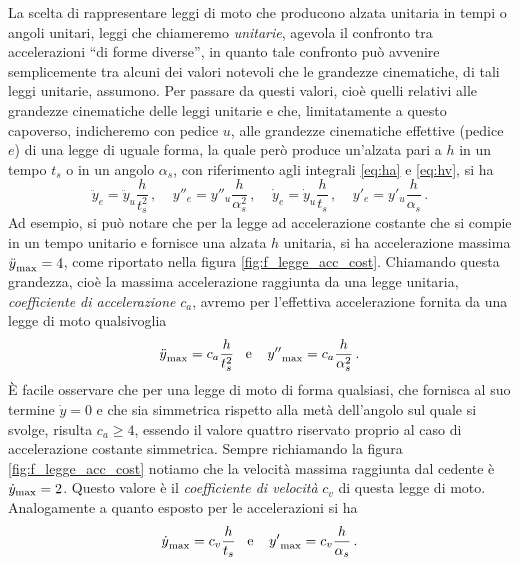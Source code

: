 La scelta di rappresentare leggi di moto che producono
alzata unitaria in tempi o angoli unitari, leggi che chiameremo {\em unitarie},
agevola il confronto
tra accelerazioni ``di forme diverse'', in quanto tale confronto
pu\`o avvenire semplicemente tra
alcuni dei valori notevoli che le grandezze cinematiche, di tali leggi
unitarie, assumono. Per passare da questi valori, cio\`e quelli
relativi alle grandezze cinematiche delle leggi unitarie e che,
limitatamente a questo capoverso, indicheremo
con pedice $u$, alle grandezze cinematiche effettive (pedice $e$) di una legge
 di uguale forma,
la quale per\`o produce un'alzata pari a $h$ in un tempo $t_s$ o in un angolo
$\alpha_s$, con riferimento agli integrali
\ref{eq:ha} e \ref{eq:hv}, si ha
\begin{equation}
\ddot y_e = \ddot y_u \frac{h}{t_s^2}\,,\;\;\;\;
{y''_e} = {y''_u} \frac{h}{\alpha_s^2}\,,\;\;\;\;
\dot y_e = \dot y_u \frac{h}{t_s}\,,\;\;\;\;
{y'_e} = {y'_u} \frac{h}{\alpha_s}\,.
\end{equation}
\noindent Ad esempio, si pu\`o notare che per la legge
ad accelerazione costante che si compie in un tempo unitario e fornisce
una alzata $h$ unitaria, si ha accelerazione massima ${{}\ddot {y}}_{\rm max}=4$,
come riportato nella figura \ref{fig:f_legge_acc_cost}.
Chiamando questa grandezza, cio\`e la massima accelerazione raggiunta
da una legge unitaria, {\em coefficiente di accelerazione} $c_a$, avremo per l'effettiva accelerazione
fornita da una legge di moto qualsivoglia
\begin{equation}
{{}\ddot{y}}_{\rm max}= c_a {h\over t_s^2}\;\;\; {\rm e}\;\;\;\;  
{{y''}}_{\rm max}= c_a {h\over \alpha_s^2}\,.  
\label{e_ca}
\end{equation}
\noindent \`E facile osservare che per una legge di moto di forma qualsiasi,
che fornisca
al suo termine $\dot {y}=0$ e che sia simmetrica rispetto alla met\`a dell'angolo sul quale si svolge, risulta $c_a \geq 4$, essendo il valore quattro
riservato proprio al caso di accelerazione costante simmetrica.
Sempre richiamando la figura \ref{fig:f_legge_acc_cost} notiamo che la velocit\`a
massima raggiunta dal cedente \`e $\dot {y}_{\rm max}=2$. Questo valore
\`e il {\em coefficiente di velocit\`a}
 $c_v$ di questa legge di moto. 
Analogamente a quanto esposto per le accelerazioni si ha
\begin{equation}
{{}\dot{y}}_{\rm max}= c_v {h\over t_s}\;\;\; {\rm e}\;\;\;\;  
{{y'}}_{\rm max}= c_v {h\over \alpha_s}\,.  
\label{e_cv}
\end{equation}
